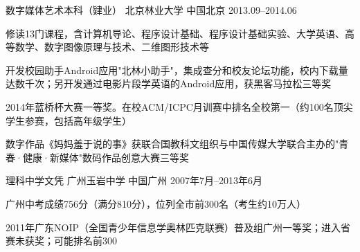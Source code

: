 \begin{cventries}
{\begin{cvitems}
      \end{cvitems}
    }
  \cventry
    {数字媒体艺术本科（肄业）} %
    {北京林业大学} %
    {中国北京} %
    {2013.09–2014.06} %
    {
      \begin{cvitems} %
        \item {修读13门课程，含计算机导论、程序设计基础、程序设计基础实验、大学英语、高等数学、数字图像原理与技术、二维图形技术等}
        \item {开发校园助手Android应用"北林小助手"，集成查分和校友论坛功能，校内下载量达数千次；另开发通过电影片段学英语的Android应用，获黑客马拉松三等奖}
        \item {2014年蓝桥杯大赛一等奖。在校ACM/ICPC月训赛中排名全校第一（约100名顶尖学生参赛，包括高年级学生）}
        \item {数字作品《妈妈羞于说的事》获联合国教科文组织与中国传媒大学联合主办的"青春·健康·新媒体"数码作品创意大赛三等奖}
      \end{cvitems}
    }

  \cventry
    {理科中学文凭} %
    {广州玉岩中学} %
    {中国广州} %
    {2007年7月–2013年6月} %
    {
      \begin{cvitems} %
        \item {广州中考成绩756分（满分810分），位列全市前300名（考生约10万人）}
        \item {2011年广东NOIP（全国青少年信息学奥林匹克联赛）普及组广州一等奖；进入省赛未获奖；可能排名前300}
      \end{cvitems}
    }

\end{cventries}
